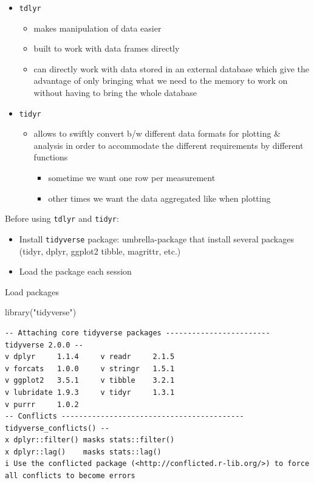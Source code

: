 \documentclass[
  letterpaper,
  DIV=11,
  numbers=noendperiod]{scrreprt}
\newenvironment{Shaded}{\begin{snugshade}}{\end{snugshade}}
\newcommand{\FunctionTok}[1]{\textcolor[rgb]{0.28,0.35,0.67}{#1}}
\newcommand{\NormalTok}[1]{\textcolor[rgb]{0.00,0.23,0.31}{#1}}
\newcommand{\StringTok}[1]{\textcolor[rgb]{0.13,0.47,0.30}{#1}}
\providecommand{\tightlist}{%
  \setlength{\itemsep}{0pt}\setlength{\parskip}{0pt}}\usepackage{longtable,booktabs,array}
\begin{document}
\begin{itemize}
\tightlist
\item
  \texttt{tdlyr}

  \begin{itemize}
  \tightlist
  \item
    makes manipulation of data easier
  \item
    built to work with data frames directly
  \item
    can directly work with data stored in an external database which
    give the advantage of only bringing what we need to the memory to
    work on without having to bring the whole database
  \end{itemize}
\item
  \texttt{tidyr}

  \begin{itemize}
  \tightlist
  \item
    allows to swiftly convert b/w different data formats for plotting \&
    analysis in order to accommodate the different requirements by
    different functions

    \begin{itemize}
    \tightlist
    \item
      sometime we want one row per measurement
    \item
      other times we want the data aggregated like when plotting
    \end{itemize}
  \end{itemize}
\end{itemize}

Before using \texttt{tdlyr} and \texttt{tidyr}:

\begin{itemize}
\tightlist
\item
  Install \texttt{tidyverse} package: umbrella-package that install
  several packages (tidyr, dplyr, ggplot2 tibble, magrittr, etc.)
\item
  Load the package each session
\end{itemize}

Load packages

\begin{Shaded}
\begin{Highlighting}[]
\FunctionTok{library}\NormalTok{(}\StringTok{"tidyverse"}\NormalTok{)}
\end{Highlighting}
\end{Shaded}

\begin{verbatim}
-- Attaching core tidyverse packages ------------------------ tidyverse 2.0.0 --
v dplyr     1.1.4     v readr     2.1.5
v forcats   1.0.0     v stringr   1.5.1
v ggplot2   3.5.1     v tibble    3.2.1
v lubridate 1.9.3     v tidyr     1.3.1
v purrr     1.0.2     
-- Conflicts ------------------------------------------ tidyverse_conflicts() --
x dplyr::filter() masks stats::filter()
x dplyr::lag()    masks stats::lag()
i Use the conflicted package (<http://conflicted.r-lib.org/>) to force all conflicts to become errors
\end{verbatim}
\end{document}
